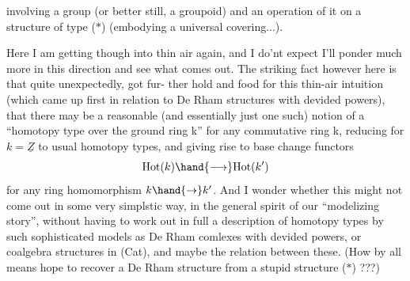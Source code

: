 
involving a group (or better still, a groupoid) and an operation of 
it on a structure of type ($\ast$) (embodying a universal covering...).

Here I am getting though into thin air again, and I do'nt expect
I'll ponder much more in this direction and see what comes out. The
striking fact however  here is that quite unexpectedly,  got fur-%
ther hold and food for this thin-air intuition (which came up first in
relation to De Rham structures with devided powers), that there may be
a reasonable (and essentially just one such) notion of a ``homotopy type
over the ground ring k'' for any commutative ring k, reducing for $k=\underline{Z}$
to usual homotopy types, and giving rise to base change functors
\[ \mathrm{Hot}(k) \hand{\longrightarrow} \mathrm{Hot}(k') \]
for any ring homomorphism $k\hand{\to} k'$. And I wonder whether this might not
come out in some very simplstic way, in the general spirit of our
``modelizing story'', without having to work out in full a description
of homotopy types by such sophisticated models as De Rham comlexes
with devided powers, or coalgebra structures in (Cat), and  maybe the
relation between these. (How by all means hope to recover a De Rham
structure from a stupid structure ($\ast$) ???)

